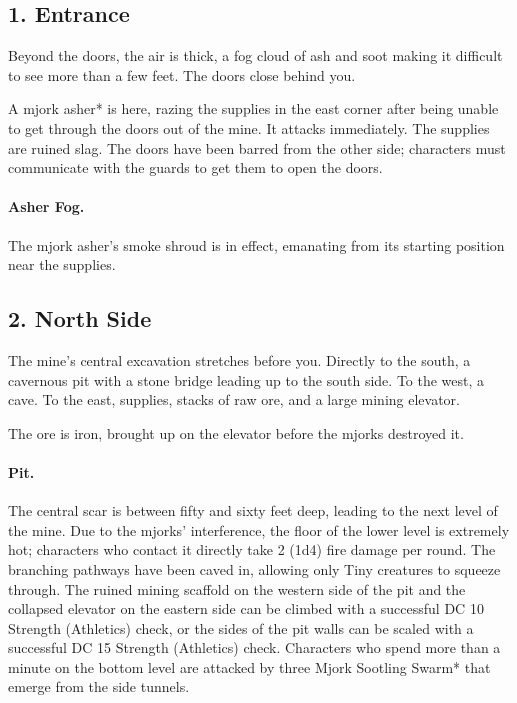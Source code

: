 \documentclass[10pt,a4paper,twoside,twocolumn,openany,bg=print,nodeprecatedcode]{dndbook}
\begin{document}
\subsection{1. Entrance}
\begin{DndReadAloud}{}
Beyond the doors, the air is thick, a fog cloud of ash and soot making it difficult to see more than a few feet. The doors close behind you.
\end{DndReadAloud}

A mjork asher* is here, razing the supplies in the east corner after being unable to get through the doors out of the mine. It attacks immediately. The supplies are ruined slag. The doors have been barred from the other side; characters must communicate with the guards to get them to open the doors.
\paragraph{Asher Fog.}
The mjork asher's smoke shroud is in effect, emanating from its starting position near the supplies.
\subsection{2. North Side}
\begin{DndReadAloud}{}
The mine's central excavation stretches before you. Directly to the south, a cavernous pit with a stone bridge leading up to the south side. To the west, a cave. To the east, supplies, stacks of raw ore, and a large mining elevator.
\end{DndReadAloud}

The ore is iron, brought up on the elevator before the mjorks destroyed it.
\paragraph{Pit.}
The central scar is between fifty and sixty feet deep, leading to the next level of the mine. Due to the mjorks' interference, the floor of the lower level is extremely hot; characters who contact it directly take 2 (1d4) fire damage per round. The branching pathways have been caved in, allowing only Tiny creatures to squeeze through. The ruined mining scaffold on the western side of the pit and the collapsed elevator on the eastern side can be climbed with a successful DC 10 Strength (Athletics) check, or the sides of the pit walls can be scaled with a successful DC 15 Strength (Athletics) check. Characters who spend more than a minute on the bottom level are attacked by three Mjork Sootling Swarm* that emerge from the side tunnels.
\end{document}
